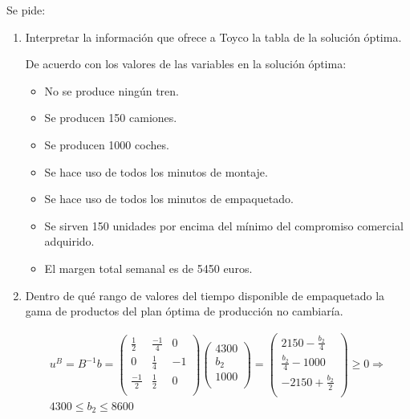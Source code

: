 Se pide:

\begin{enumerate}
    \item Interpretar la información que ofrece a Toyco la tabla de la solución óptima.

    De acuerdo con los valores de las variables en la solución óptima:
    \begin{itemize}
        \item No se produce ningún tren.
        \item Se producen 150 camiones.
        \item Se producen 1000 coches.
        \item Se hace uso de todos los minutos de montaje.
        \item Se hace uso de todos los minutos de empaquetado.
        \item Se sirven 150 unidades por encima del mínimo del compromiso comercial adquirido.
        \item El margen total semanal es de 5450 euros.
    \end{itemize}

    \item Dentro de qué rango de valores del tiempo disponible de empaquetado la gama de productos del plan óptima de producción no cambiaría.

    \begin{equation}
    \begin{split}
    u^B=B^{-1}b = \begin{pmatrix}
    \frac{1}{2} & \frac{-1}{4} & 0\\
    0 & \frac{1}{4} & -1\\
    \frac{-1}{2} & \frac{1}{2} & 0\\
    \end{pmatrix}
    \begin{pmatrix}
    4300\\
    b_2\\
    1000\\
    \end{pmatrix}
     = \begin{pmatrix}
    2150 - \frac{b_2}{4}\\
    \frac{b_2}{4} - 1000\\
    -2150 + \frac{b_2}{2}\\
    \end{pmatrix}
    \geq 0 \Rightarrow \\
    4300 \leq b_2 \leq 8600
    \end{split}
    \end{equation}


\end{enumerate}
